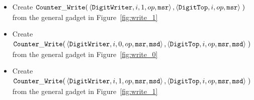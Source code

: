 \begin{itemize}
\begin{itemize}
        \item Create
        $\begin{aligned}[t]
            {\tt Counter\_Write}(& \left\langle {\tt DigitWriter}, i, 1, op, {\tt msr} \right\rangle,
                       \left\langle {\tt DigitTop},    i,    op, {\tt msr} \right\rangle \;)
        \end{aligned}$ \\ from the general gadget in Figure~\ref{fig:write_1}

        \item Create
        $\begin{aligned}[t]
            {\tt Counter\_Write}(& \left\langle {\tt DigitWriter}, i, 0, op, {\tt msr}, {\tt msd} \right\rangle,
                       \left\langle {\tt DigitTop},    i,    op, {\tt msr}, {\tt msd} \right\rangle \;)
        \end{aligned}$ \\ from the general gadget in Figure~\ref{fig:write_0}

        \item Create
        $\begin{aligned}[t]
            {\tt Counter\_Write}(& \left\langle {\tt DigitWriter}, i, 1, op, {\tt msr}, {\tt msd} \right\rangle,
                       \left\langle {\tt DigitTop},    i,    op, {\tt msr}, {\tt msd} \right\rangle \;)
        \end{aligned}$ \\ from the general gadget in Figure~\ref{fig:write_1}
    \end{itemize}


\end{itemize}

\vspace{.5cm}

